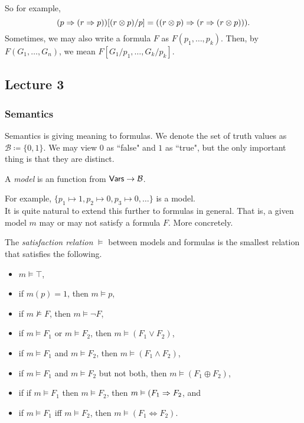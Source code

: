 So for example,
\[ (p\Rightarrow (r\Rightarrow p))[(r\otimes p)/p] = ((r\otimes p)\Rightarrow (r\Rightarrow (r\otimes p))). \]
Sometimes, we may also write a formula $F$ as $F(p_1,\ldots,p_k)$. Then, by $F(G_1,\ldots,G_n)$, we mean $F[G_1/p_1,\ldots,G_k/p_k]$.

\subsection{Lecture 3}

\subsubsection{Semantics}

Semantics is giving meaning to formulas. We denote the set of truth values as $\mathcal{B}\coloneqq\{0,1\}$. We may view $0$ as ``false" and $1$ as ``true", but the only important thing is that they are distinct.

\begin{definition}[Model]
A \textit{model} is an function from $\mathsf{Vars}\to\mathcal{B}$.
\end{definition}

For example, $\{p_1\mapsto 1, p_2\mapsto 0, p_3\mapsto 0,\ldots\}$ is a model. \\
It is quite natural to extend this further to formulas in general. That is, a given model $m$ may or may not satisfy a formula $F$. More concretely.

\begin{definition}
The \textit{satisfaction relation} $\vDash$ between models and formulas is the smallest relation that satisfies the following.
\begin{itemize}
	\item $m\vDash\top$,
	\item if $m(p)=1$, then $m\vDash p$,
	\item if $m\nvDash F$, then $m\vDash\neg F$,
	\item if $m\vDash F_1$ or $m\vDash F_2$, then $m\vDash (F_1\vee F_2)$,
	\item if $m\vDash F_1$ and $m\vDash F_2$, then $m\vDash (F_1\wedge F_2)$,
	\item if $m\vDash F_1$ and $m\vDash F_2$ but not both, then $m\vDash (F_1\oplus F_2)$,
	\item if if $m\vDash F_1$ then $m\vDash F_2$, then $m\vDash (F_1\Rightarrow F_2$, and
	\item if $m\vDash F_1$ iff $m\vDash F_2$, then $m\vDash (F_1\Leftrightarrow F_2)$.
\end{itemize}
\end{definition}

